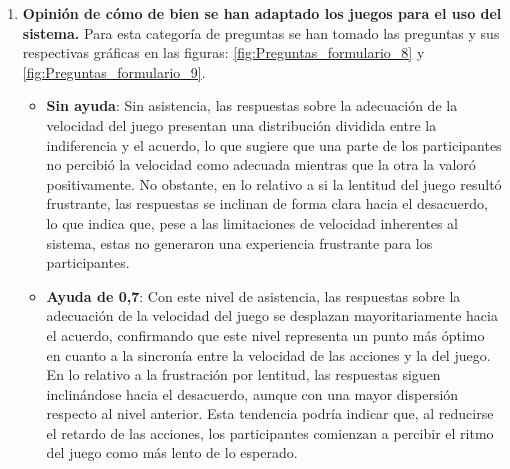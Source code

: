 \begin{enumerate}
\begin{itemize}
                  \item \textbf{Ayuda de 1}: Con asistencia total, los resultados 
    difieren considerablemente respecto a los niveles anteriores. La práctica 
    totalidad de los participantes indica no haber percibido latencia durante 
    la sesión, siendo el resto de respuestas neutras al respecto. Este resultado 
    evidencia que, incluso sin ejercer un control directo sobre el juego, los 
    participantes percibían las acciones como propias y notablemente más fluidas. 
    Un patrón idéntico se observa en las respuestas sobre la frustración generada 
    por la latencia, donde la gran mayoría de los participantes se muestra en 
    desacuerdo con haberla experimentado.

            \end{itemize}
      \item \textbf{Opinión de cómo de bien se han adaptado los juegos para el uso del sistema.} Para esta categoría de preguntas se han tomado las preguntas y sus respectivas gráficas en las figuras: \ref{fig:Preguntas_formulario_8} y \ref{fig:Preguntas_formulario_9}.
            \begin{itemize}
                  \item \textbf{Sin ayuda}: Sin asistencia, las respuestas sobre la 
    adecuación de la velocidad del juego presentan una distribución dividida 
    entre la indiferencia y el acuerdo, lo que sugiere que una parte de los 
    participantes no percibió la velocidad como adecuada mientras que la otra 
    la valoró positivamente. No obstante, en lo relativo a si la lentitud del 
    juego resultó frustrante, las respuestas se inclinan de forma clara hacia 
    el desacuerdo, lo que indica que, pese a las limitaciones de velocidad 
    inherentes al sistema, estas no generaron una experiencia frustrante para 
    los participantes.
                  \item \textbf{Ayuda de 0,7}: Con este nivel de asistencia, las 
    respuestas sobre la adecuación de la velocidad del juego se desplazan 
    mayoritariamente hacia el acuerdo, confirmando que este nivel representa 
    un punto más óptimo en cuanto a la sincronía entre la velocidad de las 
    acciones y la del juego. En lo relativo a la frustración por lentitud, 
    las respuestas siguen inclinándose hacia el desacuerdo, aunque con una 
    mayor dispersión respecto al nivel anterior. Esta tendencia podría 
    indicar que, al reducirse el retardo de las acciones, los participantes 
    comienzan a percibir el ritmo del juego como más lento de lo esperado.

\end{itemize}
\end{enumerate}
